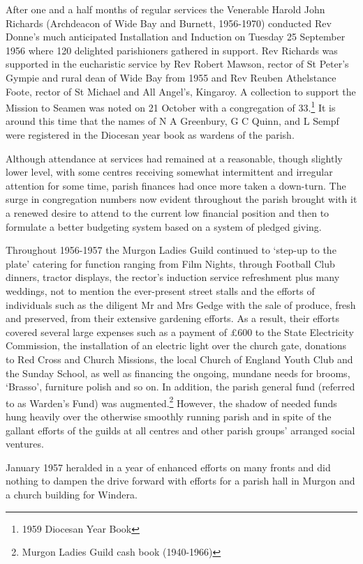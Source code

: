 After one and a half months of regular services the Venerable Harold John Richards (Archdeacon of Wide Bay and Burnett, 1956-1970) conducted Rev Donne's much anticipated Installation and Induction on Tuesday 25 September 1956 where 120 delighted parishioners gathered in support. Rev Richards was supported in the eucharistic service by Rev Robert Mawson, rector of St Peter's Gympie and rural dean of Wide Bay from 1955 and Rev Reuben Athelstance Foote, rector of St Michael and All Angel's, Kingaroy. A collection to support the Mission to Seamen was noted on 21 October with a congregation of 33.\footnote{1959 Diocesan Year Book} It is around this time that the names of N A Greenbury, G C Quinn, and L Sempf were registered in the Diocesan year book as wardens of the parish.

Although attendance at services had remained at a reasonable, though slightly lower level, with some centres receiving somewhat intermittent and irregular attention for some time, parish finances had once more taken a down-turn. The surge in congregation numbers now evident throughout the parish brought with it a renewed desire to attend to the current low financial position and then to formulate a better budgeting system based on a system of pledged giving.

Throughout 1956-1957 the Murgon Ladies Guild continued to `step-up to the plate' catering for function ranging from Film Nights, through Football Club dinners, tractor displays, the rector's induction service refreshment plus many weddings, not to mention the ever-present street stalls and the efforts of individuals such as the diligent Mr and Mrs Gedge with the sale of produce, fresh and preserved, from their extensive gardening efforts. As a result, their efforts covered several large expenses such as a payment of £600 to the State Electricity Commission, the installation of an electric light over the church gate, donations to Red Cross and Church Missions, the local Church of England Youth Club and the Sunday School, as well as financing the ongoing, mundane needs for brooms, `Brasso', furniture polish and so on. In addition, the parish general fund (referred to as Warden's Fund) was augmented.\footnote{Murgon Ladies Guild cash book (1940-1966)} However, the shadow of needed funds hung heavily over the otherwise smoothly running parish and in spite of the gallant efforts of the guilds at all centres and other parish groups' arranged social ventures.

January 1957 heralded in a year of enhanced efforts on many fronts and did nothing to dampen the drive forward with efforts for a parish hall in Murgon and a church building for Windera.

